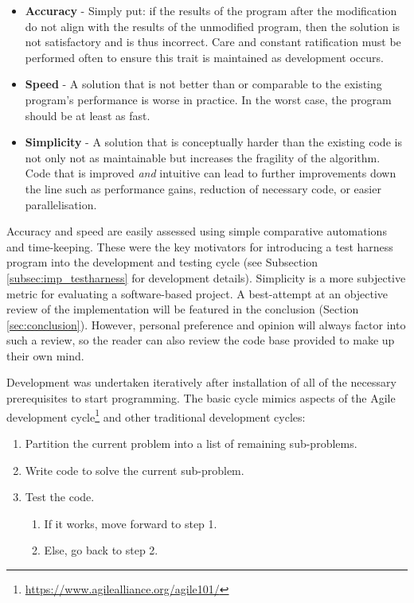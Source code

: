 \documentclass[conference]{IEEEtran}
\begin{document}
\begin{itemize}
    \item \textbf{Accuracy} - Simply put: if the results of the program after the modification do not align with the results of the unmodified program, then the solution is not satisfactory and is thus incorrect. Care and constant ratification must be performed often to ensure this trait is maintained as development occurs.
    \item \textbf{Speed} - A solution that is not better than or comparable to the existing program's performance is worse in practice. In the worst case, the program should be at least as fast.
    \item \textbf{Simplicity} - A solution that is conceptually harder than the existing code is not only not as maintainable but increases the fragility of the algorithm. Code that is improved \textit{and} intuitive can lead to further improvements down the line such as performance gains, reduction of necessary code, or easier parallelisation.
\end{itemize}

Accuracy and speed are easily assessed using simple comparative automations and time-keeping. These were the key motivators for introducing a test harness program into the development and testing cycle (see Subsection \ref{subsec:imp_testharness} for development details). Simplicity is a more subjective metric for evaluating a software-based project. A best-attempt at an objective review of the implementation will be featured in the conclusion (Section \ref{sec:conclusion}). However, personal preference and opinion will always factor into such a review, so the reader can also review the code base provided to make up their own mind.

Development was undertaken iteratively after installation of all of the necessary prerequisites to start programming. The basic cycle mimics aspects of the Agile development cycle\footnote{\url{https://www.agilealliance.org/agile101/}} and other traditional development cycles:

\begin{enumerate}
    \item Partition the current problem into a list of remaining sub-problems.
    \item Write code to solve the current sub-problem.
    \item Test the code.
    \begin{enumerate}
        \item If it works, move forward to step 1.
        \item Else, go back to step 2.
    \end{enumerate}
\end{enumerate}
\end{document}
